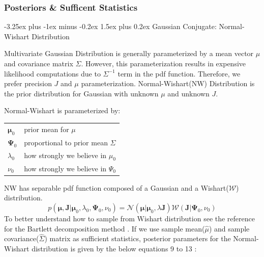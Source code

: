 \documentclass[12pt, a4paper]{article}
\makeatletter
\renewcommand{\paragraph}{\@startsection{paragraph}{4}{0ex}%
    {-3.25ex plus -1ex minus -0.2ex}%
    {1.5ex plus 0.2ex}%
    {\normalfont\normalsize\bfseries}}
\makeatother
\begin{document}
\subsubsection{Posteriors \& Sufficent Statistics}

\paragraph{Gaussian Conjugate: Normal-Wishart Distribution}

Multivariate Gaussian Distribution is generally parameterized by a mean vector
\(\mu\) and covariance matrix \(\Sigma\). However, this parameterization results in expensive likelihood computations due to $\Sigma^{-1}$ term in the pdf function. Therefore, we prefer precision $J$ and $\mu$ parameterization. Normal-Wishart(NW)
Distribution\cite{murphy2007conjugate} is the prior distribution for Gaussian with unknown \(\mu\) and unknown $J$.

Normal-Wishart is parameterized by:

\begin{center}
\begin{tabular}{|l|l|}
\hline
 $\boldsymbol \mu_0$  & prior mean for $\mu$ \\ 
 $\boldsymbol \Psi_0$ & proportional to prior mean $\Sigma$\\
 $\lambda_0$ & how strongly we believe in $\mu_0$\\
 $\nu_0$ & how strongly we believe in $\Psi_0$\\ 
 \hline
\end{tabular}
\end{center}

NW has separable pdf function composed of a Gaussian and
a Wishart(\(\mathcal{W}\)) distribution.
\begin{equation*}
p(\boldsymbol\mu,\boldsymbol J|\boldsymbol\mu_0,\lambda_0,\boldsymbol\Psi_0,\nu_0) = \mathcal{N}\left(\boldsymbol\mu\Big|\boldsymbol\mu_0,\lambda\boldsymbol J\right) \mathcal{W}(\boldsymbol J|\boldsymbol\Psi_0,\nu_0)
\end{equation*}
To better understand how to sample from Wishart distribution
see the reference for the Bartlett decomposition method \cite{wishart1928generalised}. If we use sample mean(\(\hat{\mu}\)) and sample
covariance(\(\hat{\Sigma}\)) matrix as sufficient statistics, posterior
parameters for the Normal-Wishart distribution is given by the
below equations 9 to 13 \cite{kamper2013gibbs}:

\end{document}
